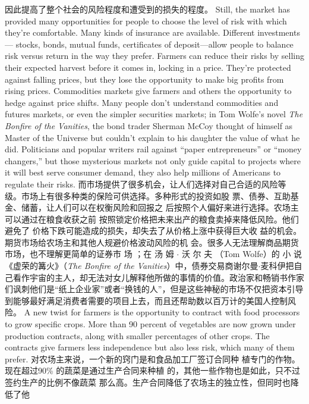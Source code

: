 \begin{paracol}{2}
因此提高了整个社会的风险程度和遭受到的损失的程度。
\switchcolumn*
Still, the market has provided many opportunities for people
to choose the level of risk with which they're comfortable.
Many kinds of insurance are available. Different investments---
stocks, bonds, mutual funds, certificates of deposit---allow people to balance risk versus return in the way they prefer. Farmers
can reduce their risks by selling their expected harvest before it
comes in, locking in a price. They're protected against falling
prices, but they lose the opportunity to make big profits from
rising prices. Commodities markets give farmers and others the
opportunity to hedge against price shifts. Many people don't
understand commodities and futures markets, or even the simpler securities markets; in Tom Wolfe's novel \textit{The Bonfire of the Vanities}, the bond trader Sherman McCoy thought of himself as
Master of the Universe but couldn't explain to his daughter the
value of what he did. Politicians and popular writers rail against
``paper entrepreneurs'' or ``money changers,'' but those mysterious markets not only guide capital to projects where it will best
serve consumer demand, they also help millions of Americans
to regulate their risks.
\switchcolumn
而市场提供了很多机会，让人们选择对自己合适的风险等
级。市场上有很多种类的保险可供选择。多种形式的投资如股
票、债券、互助基金、储蓄，让人们可以在权衡风险和回报之
后按照个人偏好来进行选择。农场主可以通过在粮食收获之前
按照锁定价格把未来出产的粮食卖掉来降低风险。他们避免了
价格下跌可能造成的损失，却失去了从价格上涨中获得巨大收
益的机会。期货市场给农场主和其他人规避价格波动风险的机
会。很多人无法理解商品期货市场，也不理解更简单的证券市
场 ；在 汤 姆 $\cdot$ 沃 尔 夫 （Tom  Wolfe）的 小 说 《虚荣的篝火》（\textit{The Bonfire of the Vanities}）中，债券交易商谢尔曼$\cdot$麦科伊把自己看作宇宙的主人，却无法对女儿解释他所做的事情的价值。政治家和畅销书作家们讽刺他们是“纸上企业家”或者“换钱的人”，但是这些神秘的市场不仅把资本引导到能够最好满足消费者需要的项目上去，而且还帮助数以百万计的美国人控制风险。
\switchcolumn*
A new twist for farmers is the opportunity to contract with
food processors to grow specific crops. More than 90 percent of
vegetables are now grown under production contracts, along
with smaller percentages of other crops. The contracts give
farmers less independence but also less risk, which many of
them prefer.
\switchcolumn
对农场主来说，一个新的窍门是和食品加工厂签订合同种
植专门的作物。现在超过90\% 的蔬菜是通过生产合同来种植
的，其他一些作物也是如此，只不过签约生产的比例不像蔬菜
那么高。生产合同降低了农场主的独立性，但同时也降低了他

\end{paracol}
